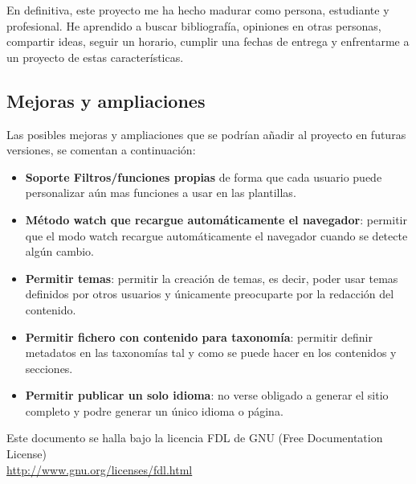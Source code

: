\documentclass[a4paper,12pt]{article}
\begin{document}
En definitiva, este proyecto me ha hecho madurar como persona, estudiante y profesional. He aprendido a buscar
bibliografía, opiniones en otras personas, compartir ideas, seguir un horario, cumplir una fechas de
entrega y enfrentarme a un proyecto de estas características.

\subsection{Mejoras y ampliaciones}

Las posibles mejoras y ampliaciones que se podrían añadir al proyecto en futuras versiones, se comentan
a continuación:

\begin{itemize}
    \item \textbf{Soporte Filtros/funciones propias} de forma que cada usuario puede personalizar aún mas
    funciones a usar en las plantillas.
    \item \textbf{Método watch que recargue automáticamente el navegador}: permitir que el modo watch recargue
    automáticamente el navegador cuando se detecte algún cambio.
    \item \textbf{Permitir temas}: permitir la creación de temas, es decir, poder usar temas definidos
    por otros usuarios y únicamente preocuparte por la redacción del contenido.
    \item \textbf{Permitir fichero con contenido para taxonomía}: permitir definir metadatos en las taxonomías
    tal y como se puede hacer en los contenidos y secciones.
    \item \textbf{Permitir publicar un solo idioma}: no verse obligado a generar el sitio completo y podre generar
    un único idioma o página.
\end{itemize}




\vspace{0.75cm}

\begin{center}
{\footnotesize Este documento se halla bajo la licencia FDL de GNU (Free Documentation
  License)\\ \url{http://www.gnu.org/licenses/fdl.html} }
\end{center}
\end{document}
